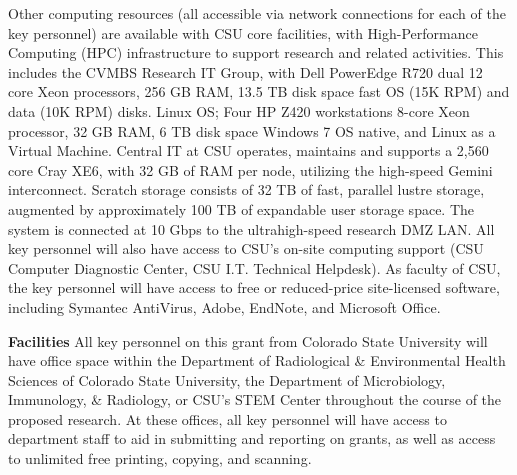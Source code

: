 \documentclass[pdftex,english,11.5pt,parskip=half]{scrartcl}
\begin{document}
Other computing resources (all accessible via network connections for each
of the key personnel) are available with CSU core facilities, with
High-Performance Computing (HPC) infrastructure to support research and
related activities. This includes the CVMBS Research IT Group, with Dell
PowerEdge R720 dual 12 core Xeon processors, 256 GB RAM, 13.5 TB disk space
fast OS (15K RPM) and data (10K RPM) disks.  Linux OS; Four HP Z420
workstations 8-core Xeon
processor, 32 GB RAM, 6 TB disk space Windows 7 OS native, and Linux as a
Virtual Machine.  Central IT at CSU operates, maintains and supports a 2,560 core Cray XE6, with 32 GB of RAM per node, utilizing the high-speed Gemini interconnect. Scratch storage consists of 32 TB of fast, parallel lustre storage, augmented by approximately 100 TB of expandable user storage space. The system is connected at 10 Gbps to the ultrahigh-speed research DMZ LAN. All key personnel will also have access to CSU’s on-site computing support (CSU Computer Diagnostic Center, CSU I.T. Technical Helpdesk). As faculty of CSU, the key personnel will have access to free or reduced-price site-licensed software, including Symantec AntiVirus, Adobe, EndNote, and Microsoft Office.


\textbf{Facilities} All key personnel on this grant from Colorado State University will have office space within the Department of Radiological \& Environmental Health Sciences of Colorado State University, the Department of Microbiology, Immunology, \& Radiology, or CSU's STEM Center throughout the course of the proposed research. At these offices, all key personnel will have access to department staff to aid in submitting and reporting on grants, as well as access to unlimited free printing, copying, and scanning.
\end{document}
